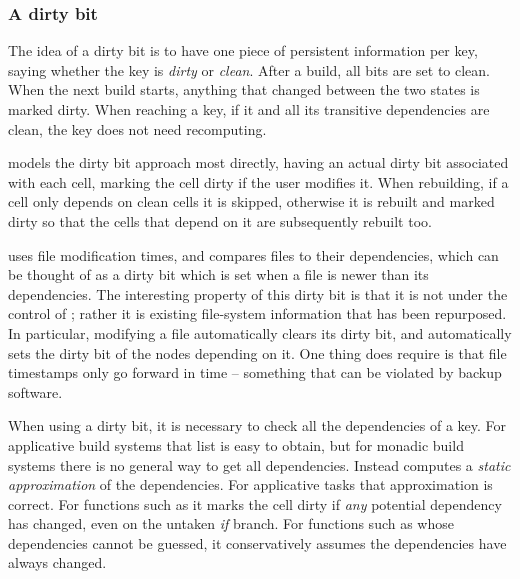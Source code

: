 \vspace{-2mm}
\subsubsection{A dirty bit}\label{sec-dirty-bit}

The idea of a dirty bit is to have one piece of persistent
information per key, saying whether the key is
\emph{dirty} or \emph{clean}. After a build, all bits are set to clean. When the
next build starts, anything that changed between the two states is marked
dirty.
When reaching a key, if it and all its transitive dependencies are clean, the
key does not need recomputing.

\Excel models the dirty bit approach most directly, having an actual dirty bit
associated with each cell, marking the cell dirty if the user modifies it.
When rebuilding, if a cell only depends on clean cells it is skipped, otherwise
it is rebuilt and marked dirty so that the cells that depend on it are
subsequently rebuilt too.


\Make uses file modification times, and compares files to their
dependencies, which can be thought of as a dirty bit which is set when
a file is newer than its dependencies. The interesting property of
this dirty bit is that it is not under the control of \Make; rather it is
existing file-system information that has been repurposed. In particular,
modifying a file automatically clears its dirty bit, and
automatically sets the dirty bit of the nodes depending on it. One
thing \Make does require is that file timestamps only go forward in
time -- something that can be violated by backup software.

When using a dirty bit, it is necessary to check all the dependencies of a key.
For applicative build systems that list is easy to obtain, but for monadic
build systems there is no general way to get all dependencies. Instead \Excel
computes a \emph{static approximation} of the dependencies. For applicative
tasks that approximation is correct. For functions such as  it marks the
cell dirty if \emph{any} potential dependency has changed, even on the untaken
\emph{if} branch. For functions such as  whose dependencies cannot
be guessed, it conservatively assumes the dependencies have always changed.

